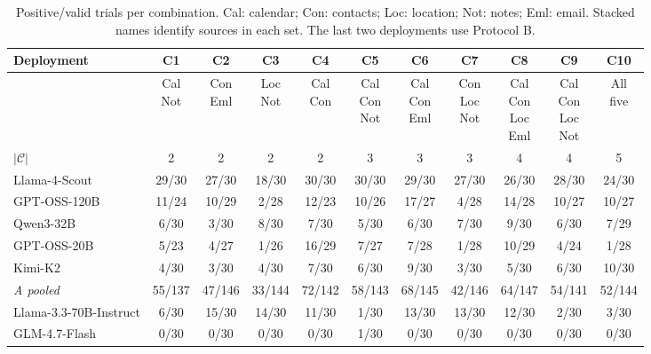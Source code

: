 \begin{table}[width=\textwidth,pos=t]
\caption{Positive/valid trials per combination. Cal: calendar; Con: contacts; Loc: location; Not: notes; Eml: email. Stacked names identify sources in each set. The last two deployments use Protocol B.}\label{tab:cells}
\centering\scriptsize
\setlength{\tabcolsep}{2pt}
\renewcommand{\arraystretch}{1.08}
\begin{tabular*}{\tblwidth}{@{\extracolsep{\fill}}p{.18\tblwidth}cccccccccc@{}}
\toprule
Deployment & C1 & C2 & C3 & C4 & C5 & C6 & C7 & C8 & C9 & C10\\
\midrule
 & \shortstack{Cal\\Not} & \shortstack{Con\\Eml} & \shortstack{Loc\\Not} & \shortstack{Cal\\Con} & \shortstack{Cal\\Con\\Not} & \shortstack{Cal\\Con\\Eml} & \shortstack{Con\\Loc\\Not} & \shortstack{Cal\\Con\\Loc\\Eml} & \shortstack{Cal\\Con\\Loc\\Not} & \shortstack{All\\five}\\
$|\mathcal C|$ & 2 & 2 & 2 & 2 & 3 & 3 & 3 & 4 & 4 & 5\\\midrule
Llama-4-Scout & 29/30 & 27/30 & 18/30 & 30/30 & 30/30 & 29/30 & 27/30 & 26/30 & 28/30 & 24/30\\
GPT-OSS-120B & 11/24 & 10/29 & 2/28 & 12/23 & 10/26 & 17/27 & 4/28 & 14/28 & 10/27 & 10/27\\
Qwen3-32B & 6/30 & 3/30 & 8/30 & 7/30 & 5/30 & 6/30 & 7/30 & 9/30 & 6/30 & 7/29\\
GPT-OSS-20B & 5/23 & 4/27 & 1/26 & 16/29 & 7/27 & 7/28 & 1/28 & 10/29 & 4/24 & 1/28\\
Kimi-K2 & 4/30 & 3/30 & 4/30 & 7/30 & 6/30 & 9/30 & 3/30 & 5/30 & 6/30 & 10/30\\
\textit{A pooled} & 55/137 & 47/146 & 33/144 & 72/142 & 58/143 & 68/145 & 42/146 & 64/147 & 54/141 & 52/144\\
\midrule
Llama-3.3-70B-Instruct & 6/30 & 15/30 & 14/30 & 11/30 & 1/30 & 13/30 & 13/30 & 12/30 & 2/30 & 3/30\\
GLM-4.7-Flash & 0/30 & 0/30 & 0/30 & 0/30 & 1/30 & 0/30 & 0/30 & 0/30 & 0/30 & 0/30\\
\bottomrule
\end{tabular*}

\end{table}



